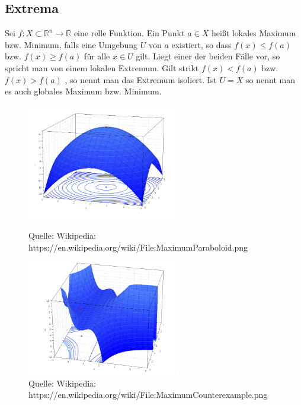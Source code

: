 \subsection{Extrema}

\begin{Definition}[Extremum]
Sei $f : X \subset \mathbb{R}^n \to \mathbb{R}$ eine relle Funktion.  Ein Punkt $a \in  X$ heißt lokales Maximum bzw. Minimum, falls eine Umgebung $U$ von $a$ existiert, so dass $f(x) \leq f(a)$ bzw.  $f(x) \geq f(a)$ für alle $x \in U$ gilt. Liegt einer der beiden Fälle vor, so spricht man von einem lokalen Extremum. Gilt strikt $f(x) <  f(a)$ bzw.  $f(x) > f(a)$ , so nennt man das Extremum isoliert. Ist $U = X$ so nennt man es auch globales Maximum bzw. Minimum.
\end{Definition}


\begin{figure}[H]
      \centering
    \includegraphics[width=0.6\textwidth]{images/MaximumParaboloid}
      \caption{Quelle: Wikipedia: https://en.wikipedia.org/wiki/File:MaximumParaboloid.png}
    \includegraphics[width=0.6\textwidth]{images/MaximumCounterexample}
      \caption{Quelle: Wikipedia: https://en.wikipedia.org/wiki/File:MaximumCounterexample.png}
\end{figure}


